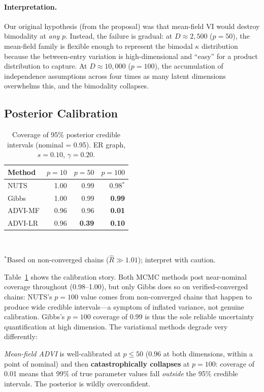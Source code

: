\documentclass[10pt,conference,compsoc]{IEEEtran}
\begin{document}
\paragraph{Interpretation.} Our original hypothesis (from the proposal) was that mean-field VI would destroy bimodality at \emph{any} $p$. Instead, the failure is gradual: at $D \approx 2{,}500$ ($p{=}50$), the mean-field family is flexible enough to represent the bimodal $\kappa$ distribution because the between-entry variation is high-dimensional and ``easy'' for a product distribution to capture. At $D \approx 10{,}000$ ($p{=}100$), the accumulation of independence assumptions across four times as many latent dimensions overwhelms this, and the bimodality collapses.

\subsection{Posterior Calibration}

\begin{table}[ht]
\centering
\caption{Coverage of 95\% posterior credible intervals (nominal = 0.95). ER graph, $s{=}0.10$, $\gamma{=}0.20$.}
\label{tab:coverage}
\small
\begin{tabular}{@{}lrrr@{}}
\toprule
\textbf{Method} & $p=10$ & $p=50$ & $p=100$ \\
\midrule
NUTS    & 1.00 & 0.99 & 0.98$^*$ \\
Gibbs   & 1.00 & 0.99 & \textbf{0.99} \\
ADVI-MF & 0.96 & 0.96 & \textbf{0.01} \\
ADVI-LR & 0.96 & \textbf{0.39} & \textbf{0.10} \\
\bottomrule
\end{tabular}\\[2pt]
\raggedright\footnotesize $^*$Based on non-converged chains ($\hat{R}\gg 1.01$); interpret with caution.
\end{table}
Table~\ref{tab:coverage} shows the calibration story. Both MCMC methods post near-nominal coverage throughout (0.98--1.00), but only Gibbs does so on verified-converged chains: NUTS's $p{=}100$ value comes from non-converged chains that happen to produce wide credible intervals---a symptom of inflated variance, not genuine calibration. Gibbs's $p{=}100$ coverage of 0.99 is thus the sole reliable uncertainty quantification at high dimension. The variational methods degrade very differently:

\emph{Mean-field ADVI} is well-calibrated at $p{\leq}50$ (0.96 at both dimensions, within a point of nominal) and then \textbf{catastrophically collapses} at $p{=}100$: coverage of 0.01 means that 99\% of true parameter values fall \emph{outside} the 95\% credible intervals. The posterior is wildly overconfident.
\end{document}
